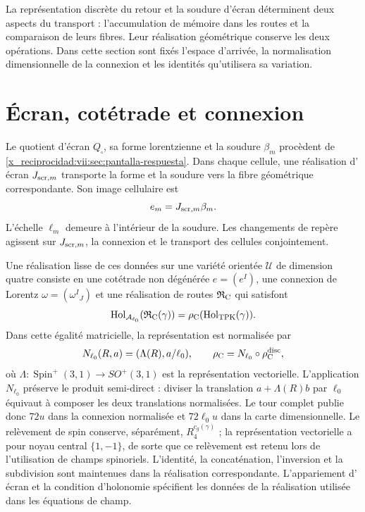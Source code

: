 La représentation discrète du retour et la soudure d'écran déterminent deux aspects du transport : l'accumulation de mémoire dans les routes et la comparaison de leurs fibres. Leur réalisation géométrique conserve les deux opérations. Dans cette section sont fixés l'espace d'arrivée, la normalisation dimensionnelle de la connexion et les identités qu'utilisera sa variation.

\section{Écran, cotétrade et connexion}

Le quotient d'écran \(Q_\square\), sa forme lorentzienne et la
soudure \(\beta_m\) procèdent de
\ref{x_reciprocidad:vii:sec:pantalla-respuesta}. Dans chaque cellule, une réalisation d'
écran \(J_{{\rm scr},m}\) transporte la forme et la soudure
vers la fibre géométrique correspondante. Son image cellulaire est
\[
 e_m=J_{{\rm scr},m}\beta_m.
\]
L'échelle \(\ell_m\) demeure à l'intérieur de la soudure. Les
changements de repère agissent sur \(J_{{\rm scr},m}\), la connexion
et le transport des cellules conjointement.

Une réalisation lisse de ces données sur une variété orientée \(\mathcal U\) de dimension quatre consiste en une cotétrade non dégénérée \(e=(e^I)\), une connexion de Lorentz \(\omega=(\omega^I{}_J)\) et une réalisation de routes \(\mathfrak R_{\rm C}\) qui satisfont
\begin{equation}
 \operatorname{Hol}_{\mathcal A_{\ell_0}}
       (\mathfrak R_{\rm C}(\gamma))
 =\rho_{\rm C}(\operatorname{Hol}_{\rm TPK}(\gamma)).
 \label{x_reciprocidad:vii:eq:compatibilidad-holonomia-geometrica}
\end{equation}
Dans cette égalité matricielle, la représentation est normalisée par
\[
 N_{\ell_0}(R,a)=(\Lambda(R),a/\ell_0),\qquad
 \rho_{\rm C}=N_{\ell_0}\circ\rho_{\rm C}^{\rm disc},
\]
où \(\Lambda:\operatorname{Spin}^+(3,1)\to SO^+(3,1)\)
est la représentation vectorielle. L'application \(N_{\ell_0}\)
préserve le produit semi-direct : diviser la translation
\(a+\Lambda(R)b\) par \(\ell_0\) équivaut à composer les
deux translations normalisées. Le tour complet publie donc
\(72u\) dans la connexion normalisée et \(72\ell_0u\) dans la
carte dimensionnelle. Le relèvement de spin conserve, séparément,
\(R_4^{c_g(\gamma)}\) ; la représentation vectorielle a pour
noyau central \(\{1,-1\}\), de sorte que ce
relèvement est retenu lors de l'utilisation de champs spinoriels.
L'identité, la concaténation, l'inversion et la subdivision sont maintenues dans la
réalisation correspondante. L'appariement d'
écran et la condition d'holonomie spécifient les données de la
réalisation utilisée dans les équations de champ.

